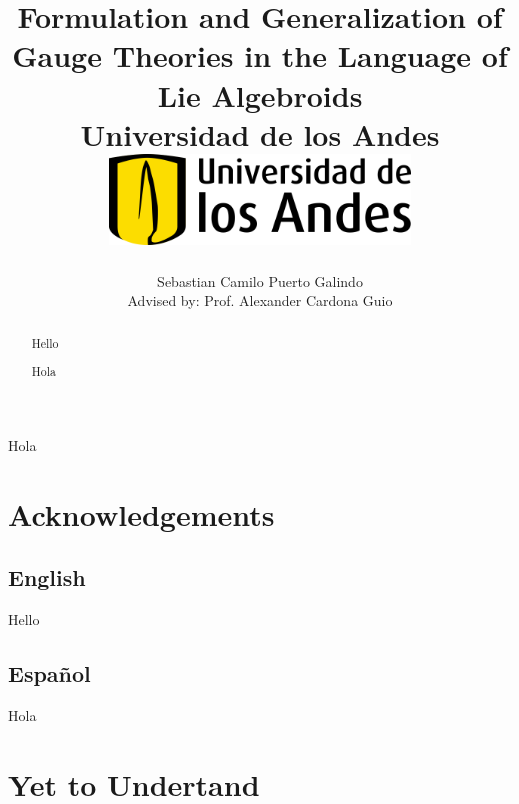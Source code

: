 \documentclass[12pt]{report}
\title 
{
	{Formulation and Generalization of Gauge Theories in the Language of Lie Algebroids}\\
	{\large Universidad de los Andes}\\
	\vspace{1.5cm}
	{\includegraphics[width = 0.6\textwidth]{logo.png}}	
}
\author{Sebastian Camilo Puerto Galindo\\[1cm]{\small Advised by: Prof. Alexander Cardona Guio}}
\newenvironment{dedication}
  {\clearpage           %
   \thispagestyle{empty}%
   \vspace*{\stretch{1}}%
   \raggedleft          %
  }
  {\par %
   \vspace{\stretch{3}} %
   \clearpage           %
  }
\theoremstyle{definition}
\begin{document}

\maketitle

\begin{dedication}
{\LARGE\calligra Hola}
\end{dedication}

\begin{abstract}
Hello
\end{abstract}

\begin{otherlanguage}{spanish}
\begin{abstract}
Hola
\end{abstract}
\end{otherlanguage}

\newpage

\chapter*{Acknowledgements}

\section*{English}
Hello
\begin{otherlanguage}{spanish}
\section*{Español}
Hola
\end{otherlanguage}

\tableofcontents


\chapter*{Yet to Undertand}
 \label{chp:understand}

\end{document}
